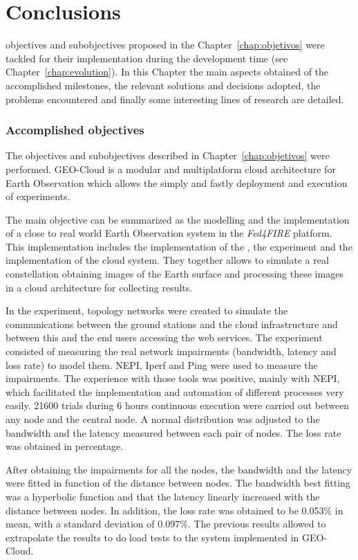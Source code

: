 \chapter{Conclusions}
\label{chap:conclusions}
 objectives and subobjectives proposed in the
Chapter~\ref{chap:objetivos} were tackled for their implementation during the
development time (see Chapter~\ref{chap:evolution}). In this Chapter the main
aspects obtained of the accomplished milestones, the relevant solutions and
decisions adopted, the problems encountered and finally some interesting lines
of research are detailed.

\subsection{Accomplished objectives}

The objectives and subobjectives described in Chapter~\ref{chap:objetivos} were
performed. GEO-Cloud is a modular and multiplatform cloud architecture for Earth Observation  which allows the simply and fastly deployment and
execution of  experiments.

The main objective can be summarized as the modelling and the implementation of
a close to real world Earth Observation system in the \emph{Fed4FIRE} platform.
This implementation includes the implementation of the \sss, the \pl
experiment and the implementation of the cloud system. They together allows to
simulate a real constellation obtaining images of the Earth surface and
processing these images in a cloud architecture for collecting results.


In the \pl experiment, topology networks were created to simulate
the communications between the ground stations and the cloud
infrastructure and between this and the end users accessing
the web services. The experiment consisted of measuring the
real network impairments (bandwidth, latency and loss rate)
to model them. NEPI, Iperf and Ping were used to measure
the impairments. The experience with those tools was positive,
mainly with NEPI, which facilitated the implementation and
automation of different processes very easily.
21600 trials during 6 hours continuous execution were
carried out between any node and the central node. A normal
distribution was adjusted to the bandwidth and the latency
measured between each pair of nodes. The loss rate was
obtained in percentage.

After obtaining the impairments for all the nodes, the
bandwidth and the latency were fitted in function of the
distance between nodes. The bandwidth best fitting was a
hyperbolic function and that the latency linearly increased with
the distance between nodes. In addition, the loss rate was
obtained to be 0.053\% in mean, with a standard deviation of
0.097\%. The previous results allowed to extrapolate the
results to do load tests to the system implemented in GEO-Cloud.

